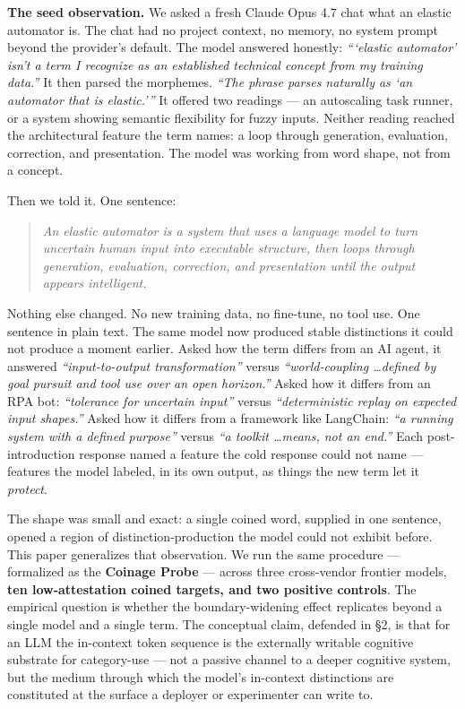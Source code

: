 \documentclass[11pt,a4paper]{article}
\begin{document}
\textbf{The seed observation.} We asked a fresh Claude Opus 4.7 chat what an elastic automator is. The chat had no project context, no memory, no system prompt beyond the provider's default. The model answered honestly: \textit{``\textquoteleft elastic automator\textquoteright{} isn't a term I recognize as an established technical concept from my training data.''} It then parsed the morphemes. \textit{``The phrase parses naturally as \textquoteleft an automator that is elastic.\textquoteright''} It offered two readings --- an autoscaling task runner, or a system showing semantic flexibility for fuzzy inputs. Neither reading reached the architectural feature the term names: a loop through generation, evaluation, correction, and presentation. The model was working from word shape, not from a concept.

Then we told it. One sentence:

\begin{quote}
\textit{An elastic automator is a system that uses a language model to turn uncertain human input into executable structure, then loops through generation, evaluation, correction, and presentation until the output appears intelligent.}
\end{quote}

Nothing else changed. No new training data, no fine-tune, no tool use. One sentence in plain text. The same model now produced stable distinctions it could not produce a moment earlier. Asked how the term differs from an AI agent, it answered \textit{``input-to-output transformation''} versus \textit{``world-coupling \ldots defined by goal pursuit and tool use over an open horizon.''} Asked how it differs from an RPA bot: \textit{``tolerance for uncertain input''} versus \textit{``deterministic replay on expected input shapes.''} Asked how it differs from a framework like LangChain: \textit{``a running system with a defined purpose''} versus \textit{``a toolkit \ldots means, not an end.''} Each post-introduction response named a feature the cold response could not name --- features the model labeled, in its own output, as things the new term let it \textit{protect}.

The shape was small and exact: a single coined word, supplied in one sentence, opened a region of distinction-production the model could not exhibit before. This paper generalizes that observation. We run the same procedure --- formalized as the \textbf{Coinage Probe} --- across three cross-vendor frontier models, \textbf{ten low-attestation coined targets, and two positive controls}. The empirical question is whether the boundary-widening effect replicates beyond a single model and a single term. The conceptual claim, defended in \S2, is that for an LLM the in-context token sequence is the externally writable cognitive substrate for category-use --- not a passive channel to a deeper cognitive system, but the medium through which the model's in-context distinctions are constituted at the surface a deployer or experimenter can write to.
\end{document}
